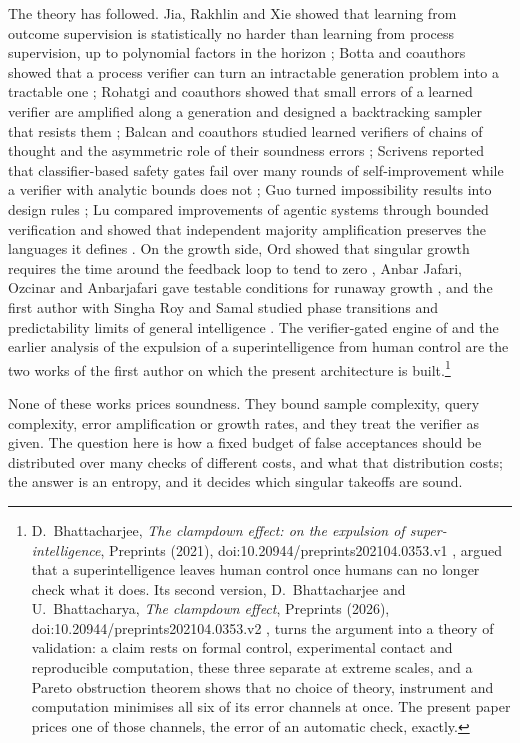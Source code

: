 The theory has followed. Jia, Rakhlin and Xie showed that learning from outcome supervision is statistically no harder than learning from process supervision, up to polynomial factors in the horizon \cite{JRX25}; Botta and coauthors showed that a process verifier can turn an intractable generation problem into a tractable one \cite{BLM25}; Rohatgi and coauthors showed that small errors of a learned verifier are amplified along a generation and designed a backtracking sampler that resists them \cite{RSS25}; Balcan and coauthors studied learned verifiers of chains of thought and the asymmetric role of their soundness errors \cite{BBF26}; Scrivens reported that classifier-based safety gates fail over many rounds of self-improvement while a verifier with analytic bounds does not \cite{Scr26}; Guo turned impossibility results into design rules \cite{Guo26}; Lu compared improvements of agentic systems through bounded verification and showed that independent majority amplification preserves the languages it defines \cite{Lu26}. On the growth side, Ord showed that singular growth requires the time around the feedback loop to tend to zero \cite{Ord26}, Anbar Jafari, Ozcinar and Anbarjafari gave testable conditions for runaway growth \cite{AOA25}, and the first author with Singha Roy and Samal studied phase transitions and predictability limits of general intelligence \cite{BSS26}. The verifier-gated engine of \cite{Bha26a} and the earlier analysis of the expulsion of a superintelligence from human control \cite{Bha21} are the two works of the first author on which the present architecture is built.\footnote{D.~Bhattacharjee, \emph{The clampdown effect: on the expulsion of super-intelligence}, Preprints (2021), doi:10.20944/preprints202104.0353.v1 \cite{Bha21}, argued that a superintelligence leaves human control once humans can no longer check what it does. Its second version, D.~Bhattacharjee and U.~Bhattacharya, \emph{The clampdown effect}, Preprints (2026), doi:10.20944/preprints202104.0353.v2 \cite{BB26a}, turns the argument into a theory of validation: a claim rests on formal control, experimental contact and reproducible computation, these three separate at extreme scales, and a Pareto obstruction theorem shows that no choice of theory, instrument and computation minimises all six of its error channels at once. The present paper prices one of those channels, the error of an automatic check, exactly.}

None of these works prices soundness. They bound sample complexity, query complexity, error amplification or growth rates, and they treat the verifier as given. The question here is how a fixed budget of false acceptances should be distributed over many checks of different costs, and what that distribution costs; the answer is an entropy, and it decides which singular takeoffs are sound.

